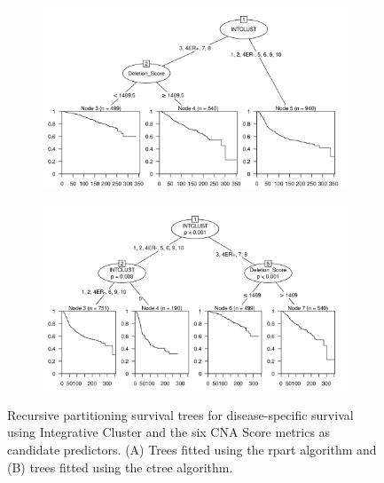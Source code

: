 \begin{figure}[!h]
\centering

\vspace{0.5cm}

\begin{subfigure}{\textwidth}
\subcaption{}
\includegraphics[width=1\textwidth]{../figures/Chapter_3/PartyKit_Survival_Score_DSS_INTCLUST.png}
\end{subfigure}

\vspace{2cm}

\begin{subfigure}{\textwidth}
\subcaption{}
\includegraphics[width=1\textwidth]{../figures/Chapter_3/Ctree_Survival_Score_DSS_INTCLUST.png}
\end{subfigure}

\vspace{0.5cm}

\caption[Recursive partitioning survival trees for disease-specific survival using Integrative Cluster and the six CNA Score metrics as candidate predictors.]{Recursive partitioning survival trees for disease-specific survival using Integrative Cluster and the six CNA Score metrics as candidate predictors. (A) Trees fitted using the rpart algorithm and (B) trees fitted using the ctree algorithm.}
\label{fig:INTCLUST_CNA_Score_DSS}
\end{figure}

